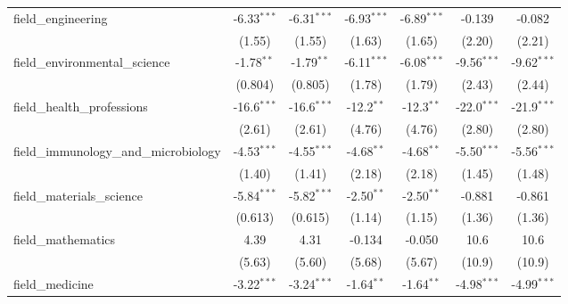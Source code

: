 \begin{tabular}{lcccccc}
   field\_engineering                                          & -6.33$^{***}$  & -6.31$^{***}$  & -6.93$^{***}$ & -6.89$^{***}$ & -0.139        & -0.082\\   
                                                               & (1.55)         & (1.55)         & (1.63)        & (1.65)        & (2.20)        & (2.21)\\   
   field\_environmental\_science                               & -1.78$^{**}$   & -1.79$^{**}$   & -6.11$^{***}$ & -6.08$^{***}$ & -9.56$^{***}$ & -9.62$^{***}$\\   
                                                               & (0.804)        & (0.805)        & (1.78)        & (1.79)        & (2.43)        & (2.44)\\   
   field\_health\_professions                                  & -16.6$^{***}$  & -16.6$^{***}$  & -12.2$^{**}$  & -12.3$^{**}$  & -22.0$^{***}$ & -21.9$^{***}$\\   
                                                               & (2.61)         & (2.61)         & (4.76)        & (4.76)        & (2.80)        & (2.80)\\   
   field\_immunology\_and\_microbiology                        & -4.53$^{***}$  & -4.55$^{***}$  & -4.68$^{**}$  & -4.68$^{**}$  & -5.50$^{***}$ & -5.56$^{***}$\\   
                                                               & (1.40)         & (1.41)         & (2.18)        & (2.18)        & (1.45)        & (1.48)\\   
   field\_materials\_science                                   & -5.84$^{***}$  & -5.82$^{***}$  & -2.50$^{**}$  & -2.50$^{**}$  & -0.881        & -0.861\\   
                                                               & (0.613)        & (0.615)        & (1.14)        & (1.15)        & (1.36)        & (1.36)\\   
   field\_mathematics                                          & 4.39           & 4.31           & -0.134        & -0.050        & 10.6          & 10.6\\   
                                                               & (5.63)         & (5.60)         & (5.68)        & (5.67)        & (10.9)        & (10.9)\\   
   field\_medicine                                             & -3.22$^{***}$  & -3.24$^{***}$  & -1.64$^{**}$  & -1.64$^{**}$  & -4.98$^{***}$ & -4.99$^{***}$\\   

\end{tabular}
